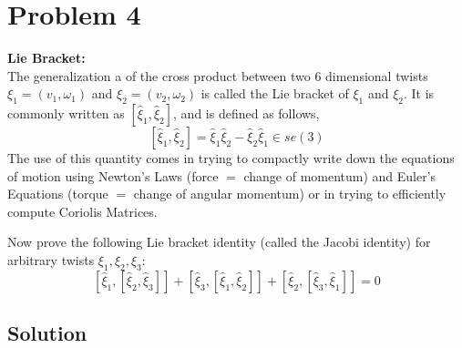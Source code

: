 \section*{Problem 4}
\setcounter{section}{4}
\setcounter{equation}{0}

\textbf{Lie Bracket:} \\
The generalization a of the cross product between two 6 dimensional twists \( \xi_{1}=\left(v_{1}, \omega_{1}\right) \) and \( \xi_{2}=\left(v_{2}, \omega_{2}\right) \) is called the Lie bracket of \( \xi_{1} \) and \( \xi_{2} \).
It is commonly written as \( \left[\widehat{\xi}_{1}, \widehat{\xi}_{2}\right] \), and is defined as follows,
\[
    \left[\widehat{\xi}_{1}, \widehat{\xi}_{2}\right]=\widehat{\xi}_{1} \widehat{\xi}_{2}-\widehat{\xi}_{2} \widehat{\xi}_{1} \in s e(3)
\]
The use of this quantity comes in trying to compactly write down the equations of motion using Newton's Laws (force \( = \) change of momentum) and Euler's Equations (torque \( = \) change of angular momentum) or in trying to efficiently compute Coriolis Matrices.

Now prove the following Lie bracket identity (called the Jacobi identity) for arbitrary twists \( \xi_{1}, \xi_{2}, \xi_{3} \):
\[
    \left[\widehat{\xi}_{1},\left[\widehat{\xi}_{2}, \widehat{\xi}_{3}\right]\right]+\left[\widehat{\xi}_{3},\left[\widehat{\xi}_{1}, \widehat{\xi}_{2}\right]\right]+\left[\widehat{\xi}_{2},\left[\widehat{\xi}_{3}, \widehat{\xi}_{1}\right]\right]=0
\]

\subsection*{Solution}

